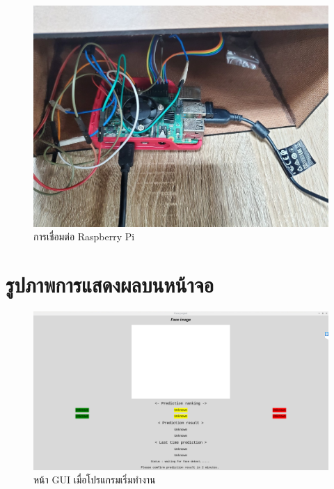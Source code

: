 \begin{figure}[!ht]
  \begin{center}
    \includegraphics[scale=.17]{pic/rpi.jpg}
    \caption[การเชื่อมต่อ Raspberry Pi]{การเชื่อมต่อ Raspberry Pi}
    \label{fig:rpi_module}
  \end{center}
\end{figure}

\newpage
\section{รูปภาพการแสดงผลบนหน้าจอ}

\begin{figure}[!ht]
    \begin{center}
      \includegraphics[scale=.35]{pic/main_page.png}
      \caption[หน้า GUI เมื่อโปรแกรมเริ่มทำงาน]{หน้า GUI เมื่อโปรแกรมเริ่มทำงาน}
      \label{fig:main_page}
    \end{center}
  \end{figure}



